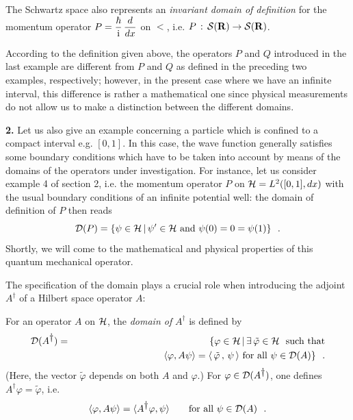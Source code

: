 \documentclass[a4wide,12pt]{report}
\begin{document}
The Schwartz space also represents an 
{\em invariant domain of definition}
for the momentum operator 
$P = \ds{\hbar \over \ri} \, \ds{d \over
dx}$ on $\lt$, i.e. 
$P \, : \, \st \rightarrow \st$.

According to the definition given above, the operators $P$ and $Q$
introduced in the last example are  different
from $P$ and $Q$ as defined in the 
preceding two examples, respectively; however, 
in the present case where we have an infinite interval,  
this difference is rather 
 a mathematical one since
physical measurements do not allow us to make  
a distinction between the different domains. 

\medskip 
\noindent
{\bf 2.} 
Let us also give an example concerning a particle 
which is confined  
to a compact interval e.g. $[0,1 ]$. 
In this case, the wave 
function generally satisfies some boundary conditions
which have to be taken into account by means of the 
domains of the operators under investigation. 
For instance, let us consider example 4 of section 2, 
i.e. the momentum operator $P$ on  
$\hs =  L^2 ([0,1], dx)$ 
with the usual boundary conditions 
of an infinite potential well: 
the domain of definition of $P$ then reads  
\begin{equation}
\label{dir}
{\cal D} (P) = \{ \psi \in \hs \, | \,
\psi^{\prime} \in \hs \ {\rm and} \ \psi(0) = 0 = \psi(1) \}
\ \ .
\end{equation} 
Shortly, we will come to the mathematical and physical 
properties of this quantum mechanical operator. 

\bigskip 

The specification of the domain 
plays a crucial role when  
introducing the adjoint $A^{\dag}$ of a
Hilbert space operator
$A$:




\begin{defin}
For an operator $A$ on $\hs$, the 
{\em domain of} $A^{\dag}$
is defined by 
\begin{eqnarray*}
{\cal D} (A^{\dag}) & = & \{ \varphi \in \hs \, | \, \exists\,
\tilde{\varphi} \in \hs \ \ \mbox{such that}
\\
&& \qquad \qquad \qquad \qquad \quad
\left\langle \varphi , A \psi \right\rangle =
\langle \, \tilde \varphi  \, , \, \psi \, \rangle
\ \mbox{for all} \ \psi  \in {\cal D} (A) \}
\ \ .
\end{eqnarray*}
(Here, the vector $\tilde{\varphi}$
depends on both $A$ and  $\varphi$.)
For $\varphi \in {\cal D}(A^{\dag})$, one defines
$A^{\dag} \varphi = \tilde \varphi$, i.e.
\begin{equation}
\label{defa}
\langle \varphi , A \psi \rangle =
\langle A^{\dag} \varphi , \psi \rangle
\qquad \mbox{for all} \ \psi \in {\cal D}(A)
\ \ .
\end{equation}
\end{defin}
\end{document}

